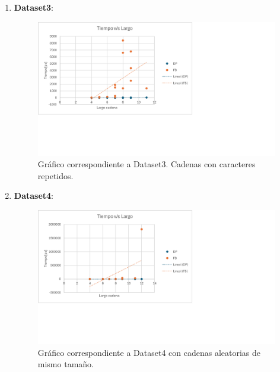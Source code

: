 \begin{enumerate}
    \item \textbf{Dataset3}: 
    \begin{figure}[H]
        \centering
        \includegraphics[width=\textwidth]{tikz/Grafico3.png}
        \caption{Gráfico correspondiente a Dataset3. Cadenas con caracteres repetidos.}
        \label{fig:dataset3}
    \end{figure}

    \item \textbf{Dataset4}: 
    \begin{figure}[H]
        \centering
        \includegraphics[width=\textwidth]{tikz/Grafico4.png}
        \caption{Gráfico correspondiente a Dataset4 con cadenas aleatorias de mismo tamaño.}
        \label{fig:dataset4}
    \end{figure}


\end{enumerate}
